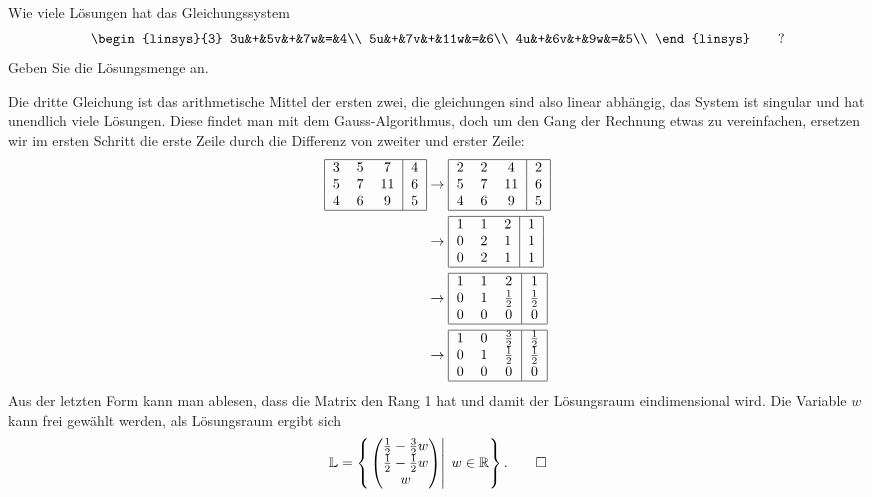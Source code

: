 Wie viele Lösungen hat das Gleichungssystem
\[
\begin{linsys}{3}
3u&+&5v&+&7w&=&4\\
5u&+&7v&+&11w&=&6\\
4u&+&6v&+&9w&=&5\\
\end{linsys}
\qquad
?
\]
Geben Sie die Lösungsmenge an.

\begin{loesung}
Die dritte Gleichung ist das arithmetische Mittel der ersten zwei,
die gleichungen sind also linear abhängig, das System ist singular
und hat unendlich viele Lösungen. Diese findet man mit dem
Gauss-Algorithmus, doch um den Gang der Rechnung etwas zu vereinfachen,
ersetzen wir im ersten Schritt die erste Zeile durch die Differenz von
zweiter und erster Zeile:
\begin{align*}
\begin{tabular}{|ccc|c|}
\hline
3&5&7&4\\
5&7&11&6\\
4&6&9&5\\
\hline
\end{tabular}
&\rightarrow
\begin{tabular}{|ccc|c|}
\hline
2&2&4&2\\
5&7&11&6\\
4&6&9&5\\
\hline
\end{tabular}
\\
&\rightarrow
\begin{tabular}{|ccc|c|}
\hline
1&1&2&1\\
0&2&1&1\\
0&2&1&1\\
\hline
\end{tabular}
\\
&\rightarrow
\begin{tabular}{|ccc|c|}
\hline
1&1&2&1\\
0&1&$\frac12$&$\frac12$\\
0&0&0&0\\
\hline
\end{tabular}
\\
&\rightarrow
\begin{tabular}{|ccc|c|}
\hline
1&0&$\frac32$&$\frac12$\\
0&1&$\frac12$&$\frac12$\\
0&0&0&0\\
\hline
\end{tabular}
\end{align*}
Aus der letzten Form kann man ablesen, dass die Matrix den
Rang 1 hat und damit der Lösungsraum eindimensional wird.
Die Variable $w$ kann frei gewählt werden, als Lösungsraum
ergibt sich
\[
{\mathbb L}=\left\{\left.\begin{pmatrix}\frac12-\frac32w\\\frac12-\frac12w\\w\end{pmatrix}\right|\;w\in\mathbb R\right\}.
\qedhere
\]
\end{loesung}

